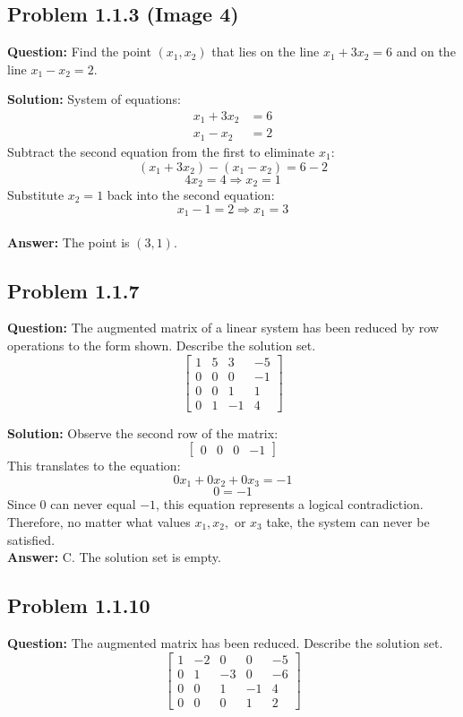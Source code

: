\documentclass[11pt]{article}
\begin{document}
\subsection*{Problem 1.1.3 (Image 4)}
\textbf{Question:} Find the point $(x_1, x_2)$ that lies on the line $x_1 + 3x_2 = 6$ and on the line $x_1 - x_2 = 2$.

\textbf{Solution:}
System of equations:
\begin{align*}
    x_1 + 3x_2 &= 6 \\
    x_1 - x_2 &= 2
\end{align*}
Subtract the second equation from the first to eliminate $x_1$:
\[ (x_1 + 3x_2) - (x_1 - x_2) = 6 - 2 \]
\[ 4x_2 = 4 \Rightarrow x_2 = 1 \]
Substitute $x_2 = 1$ back into the second equation:
\[ x_1 - 1 = 2 \Rightarrow x_1 = 3 \]
\\
\textbf{Answer:} The point is $(3, 1)$.


\subsection*{Problem 1.1.7}
\textbf{Question:} The augmented matrix of a linear system has been reduced by row operations to the form shown. Describe the solution set.
\[
\begin{bmatrix}
1 & 5 & 3 & -5 \\
0 & 0 & 0 & -1 \\
0 & 0 & 1 & 1 \\
0 & 1 & -1 & 4
\end{bmatrix}
\]

\textbf{Solution:}
Observe the second row of the matrix:
\[ \begin{bmatrix} 0 & 0 & 0 & -1 \end{bmatrix} \]
This translates to the equation:
\[ 0x_1 + 0x_2 + 0x_3 = -1 \]
\[ 0 = -1 \]
Since $0$ can never equal $-1$, this equation represents a logical contradiction. Therefore, no matter what values $x_1, x_2,$ or $x_3$ take, the system can never be satisfied.
\\
\textbf{Answer:} C. The solution set is empty.


\subsection*{Problem 1.1.10}
\textbf{Question:} The augmented matrix has been reduced. Describe the solution set.
\[
\begin{bmatrix}
1 & -2 & 0 & 0 & -5 \\
0 & 1 & -3 & 0 & -6 \\
0 & 0 & 1 & -1 & 4 \\
0 & 0 & 0 & 1 & 2
\end{bmatrix}
\]
\end{document}
